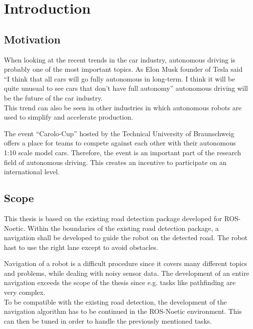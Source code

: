 \chapter{Introduction}
\label{introduction}


\section{Motivation}
When looking at the recent trends in the car industry, autonomous driving is probably one of the most important topics. As Elon Musk founder of Tesla said ``I think that all cars will go fully autonomous in long-term. I think it will be quite unusual to see cars that don’t have full autonomy'' autonomous driving will be the future of the car industry\cite{musk}.\\

This trend can also be seen in other industries in which autonomous robots are used to simplify and accelerate production. 

The event ``Carolo-Cup'' hosted by the Technical University of Braunschweig offers a place for teams to compete against each other with their autonomous 1:10 scale model cars. Therefore, the event is an important part of the research field of autonomous driving. This creates an incentive to participate on an international level.

\section{Scope}


This thesis is based on the existing road detection package developed for ROS-Noetic. Within the boundaries of the existing road detection package, a navigation shall be developed to guide the robot on the detected road. The robot hast to use the right lane except to avoid obstacles.

Navigation of a robot is a difficult procedure since it covers many different topics and problems, while dealing with noisy sensor data. The development of an entire navigation exceeds the scope of the thesis since e.g. tasks like pathfinding are very complex.\\

To be compatible with the existing road detection, the development of the navigation algorithm has to be continued in the ROS-Noetic environment. This can then be tuned in order to handle the previously mentioned tasks.\\

